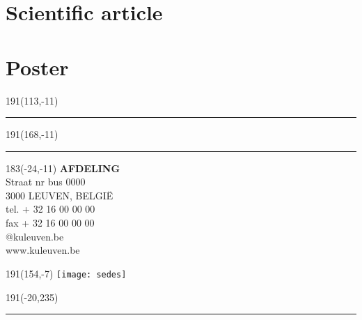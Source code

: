 \documentclass[12pt,a4paper,oneside]{book}
\begin{document}






\chapter{Scientific article}


\chapter{Poster}



\newpage
\thispagestyle{empty}
\sffamily
%
\begin{textblock}{191}(113,-11)
{\color{blueline}\rule{160pt}{5.5pt}}
\end{textblock}
%
\begin{textblock}{191}(168,-11)
{\color{blueline}\rule{5.5pt}{59pt}}
\end{textblock}
%
\begin{textblock}{183}(-24,-11)
\textblockcolour{}
\flushright
\fontsize{7}{7.5}\selectfont
\textbf{AFDELING}\\
Straat nr bus 0000\\
3000 LEUVEN, BELGI\"{E}\\
tel. + 32 16 00 00 00\\
fax + 32 16 00 00 00\\
@kuleuven.be\\
www.kuleuven.be\\
\end{textblock}
%
\begin{textblock}{191}(154,-7)
\textblockcolour{}
\texttt{[image: sedes]}
\end{textblock}
%
\begin{textblock}{191}(-20,235)
{\color{bluetitle}\rule{544pt}{55pt}}
\end{textblock}
\end{document}
